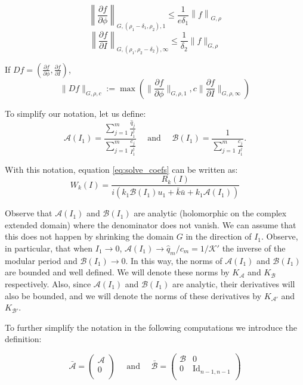 \begin{lemma}
$$\left\|\frac{\partial f}{\partial \phi}\right\|_{G,(\rho_1-\delta_1, \rho_2),1}\leq \frac{1}{e\delta_1}\left\|f\right\|_{G,\rho}$$
$$\left\|\frac{\partial f}{\partial I}\right\|_{G,(\rho_1, \rho_2-\delta_2),\infty}\leq \frac{1}{\delta_2}\|f\|_{G,\rho}$$
\end{lemma}

\begin{definition}
If $Df=(\frac{\partial f}{\partial \phi}, \frac{\partial f}{\partial I})$,
$$\|Df\|_{G,\rho,c}:= \max\left(\|\frac{\partial f}{\partial \phi}\|_{G,\rho,1},c\|\frac{\partial f}{\partial I}\|_{G,\rho,\infty}\right)$$
\end{definition}

\begin{definition}To simplify our notation, let us define:
$$\mathcal{A}(I_1) = \frac{\sum_{j = 1}^{m}\frac{\hat{q}_j}{I_1^j}}{\sum_{j=1}^m \frac{c_j}{I_1^j}} \quad \text{ and } \quad \mathcal{B}(I_1) = \frac{1}{\sum_{j=1}^m \frac{c_j}{I_1^j}}.$$
\end{definition}

\begin{remark}
With this notation, equation \ref{eq:solve_coefs} can be written as:
$$W_k(I) = \frac{R_k(I)}{i(k_1 \mathcal{B}(I_1) u_1 + \bar{k}\bar{u} + k_1 \mathcal{A}(I_1))}$$
\end{remark}



Observe that $\mathcal{A}(I_1)$ and $\mathcal{B}(I_1)$ are analytic (holomorphic on the complex extended domain) where the denominator does not vanish. We can assume that this does not happen by shrinking the domain $G$ in the direction of $I_1$. Observe, in particular, that when $I_1 \rightarrow 0$, $\mathcal{A}(I_1) \rightarrow \hat q_m/c_m = 1/\mathcal{K}'$ the inverse of the modular period and $\mathcal{B}(I_1) \rightarrow 0$. In this way,  the norms of $\mathcal{A}(I_1)$ and $\mathcal{B}(I_1)$ are bounded and well defined. We will denote these norms by $K_{\mathcal{A}}$ and $K_{\mathcal{B}}$ respectively. Also, since $\mathcal{A}(I_1)$ and $\mathcal{B}(I_1)$ are analytic, their derivatives will also be bounded, and we will denote the norms of these derivatives by $K_{\mathcal{A}'}$ and $K_{\mathcal{B}'}$.


To further simplify  the notation in the following computations we introduce the definition:

\begin{definition}

$$
\bar{\mathcal{A}} = \left(\begin{array}{c}
\mathcal{A}\\
0 \\
\end{array}\right)
\quad \text{ and } \quad
\bar{\mathcal{B}} = \left(\begin{array}{cc}
\mathcal{B} & 0\\
0 & \text{Id}_{n-1,n-1}\\
\end{array}\right)
$$

\end{definition}

